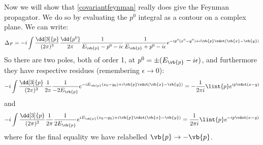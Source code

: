 \documentclass{jknotes} %
\begin{document}
Now we will show that \eqref{covariantfeynman} really does give the Feynman propagator. We do so by evaluating the \(p^0\) integral as a contour on a complex plane. 
We can write:
\begin{equation}
    \Delta_F = -i \int \frac{\dd[3]{p}}{(2\pi)^3}\frac{\dd{p^0}}{2\pi}\frac{1}{E_{\vb{p}}-p^0-i\epsilon}\frac{1}{E_{\vb{p}}+p^0-i\epsilon} e^{-ip^0(x^0-y^0)+i\vb{p}\vdot(\vb{x}-\vb{y})}
\end{equation}
So there are two poles, both of order 1, at \(p^0 = \pm(E_{\vb{p}}-i\epsilon)\), and furthermore they have respective residues (remembering \(\epsilon\rightarrow0\)):
\begin{equation}
    -i\int\frac{\dd[3]{p}}{(2\pi)^3}\frac{1}{2\pi}\frac{1}{-2E_{\vb{p}}}e^{-iE_{\vb{p}}(x_0-y_0) + i\vb{p}\vdot(\vb{x}-\vb{y})}
    = -\frac{1}{2\pi i}\lint{p}e^{ip\vdot(x-y)}
\end{equation}
and
\begin{equation}
    -i\int\frac{\dd[3]{p}}{(2\pi)^3}\frac{1}{2\pi}\frac{1}{2E_{\vb{p}}}e^{iE_{\vb{p}}(x_0-y_0) + i\vb{p}\vdot(\vb{x}-\vb{y})}
    = \frac{1}{2\pi i}\lint{p}e^{-ip\vdot(x-y)}
\end{equation}
where for the final equality we have relabelled \(\vb{p}\rightarrow-\vb{p}\).
\end{document}
